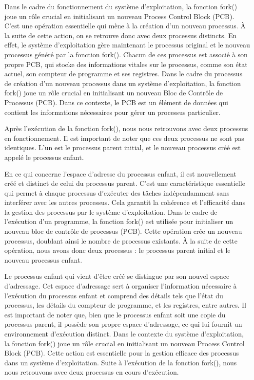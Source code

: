 \documentclass[12pt]{article}
\begin{document}
Dans le cadre du fonctionnement du système d'exploitation, la fonction fork() joue un rôle crucial en initialisant un nouveau Process Control Block (PCB). C'est une opération essentielle qui mène à la création d'un nouveau processus. À la suite de cette action, on se retrouve donc avec deux processus distincts. En effet, le système d'exploitation gère maintenant le processus original et le nouveau processus généré par la fonction fork(). Chacun de ces processus est associé à son propre PCB, qui stocke des informations vitales sur le processus, comme son état actuel, son compteur de programme et ses registres.
Dans le cadre du processus de création d'un nouveau processus dans un système d'exploitation, la fonction fork() joue un rôle crucial en initialisant un nouveau Bloc de Contrôle de Processus (PCB). Dans ce contexte, le PCB est un élément de données qui contient les informations nécessaires pour gérer un processus particulier.

Après l'exécution de la fonction fork(), nous nous retrouvons avec deux processus en fonctionnement. Il est important de noter que ces deux processus ne sont pas identiques. L'un est le processus parent initial, et le nouveau processus créé est appelé le processus enfant.

En ce qui concerne l'espace d'adresse du processus enfant, il est nouvellement créé et distinct de celui du processus parent. C'est une caractéristique essentielle qui permet à chaque processus d'exécuter des tâches indépendamment sans interférer avec les autres processus. Cela garantit la cohérence et l'efficacité dans la gestion des processus par le système d'exploitation.
Dans le cadre de l'exécution d'un programme, la fonction fork() est utilisée pour initialiser un nouveau bloc de contrôle de processus (PCB). Cette opération crée un nouveau processus, doublant ainsi le nombre de processus existants. À la suite de cette opération, nous avons donc deux processus : le processus parent initial et le nouveau processus enfant.

Le processus enfant qui vient d'être créé se distingue par son nouvel espace d'adressage. Cet espace d'adressage sert à organiser l'information nécessaire à l'exécution du processus enfant et comprend des détails tels que l'état du processus, les détails du compteur de programme, et les registres, entre autres. Il est important de noter que, bien que le processus enfant soit une copie du processus parent, il possède son propre espace d'adressage, ce qui lui fournit un environnement d'exécution distinct.
Dans le contexte du système d'exploitation, la fonction fork() joue un rôle crucial en initialisant un nouveau Process Control Block (PCB). Cette action est essentielle pour la gestion efficace des processus dans un système d'exploitation. Suite à l'exécution de la fonction fork(), nous nous retrouvons avec deux processus en cours d'exécution. 
\end{document}
